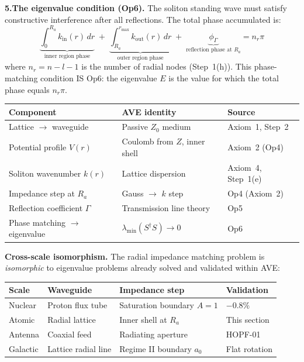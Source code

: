 \noindent\textbf{5.\;The eigenvalue condition (Op6).}
The soliton standing wave must satisfy constructive
interference after all reflections.
The total phase accumulated is:
\begin{equation}
    \underbrace{\int_0^{R_a} k_{\text{in}}(r)\,dr}_
    {\text{inner region phase}}
    \;+\;
    \underbrace{\int_{R_a}^{r_{\max}} k_{\text{out}}(r)\,dr}_
    {\text{outer region phase}}
    \;+\;
    \underbrace{\phi_\Gamma}_
    {\text{reflection phase at } R_a}
    = n_r \pi
    \label{eq:radial_eigenvalue}
\end{equation}
where $n_r = n - l - 1$ is the number of radial
nodes (Step~1(h)).  This phase-matching condition IS
Op6: the eigenvalue $E$ is the value for which the
total phase equals $n_r \pi$.

\begin{center}
\small
\renewcommand{\arraystretch}{1.25}
\begin{tabular}{lll}
\hline
\textbf{Component} & \textbf{AVE identity}
& \textbf{Source} \\
\hline
Lattice $\to$ waveguide & Passive $Z_0$ medium
& Axiom~1, Step~2 \\
Potential profile $V(r)$ & Coulomb from $Z$,
inner shell & Axiom~2 (Op4) \\
Soliton wavenumber $k(r)$ & Lattice dispersion
& Axiom~4, Step~1(e) \\
Impedance step at $R_a$ & Gauss $\to$ $k$ step
& Op4 (Axiom~2) \\
Reflection coefficient $\Gamma$ & Transmission line
theory & Op5 \\
Phase matching $\to$ eigenvalue & $\lambda_{\min}
(S^\dagger S) \to 0$ & Op6 \\
\hline
\end{tabular}
\end{center}

\noindent\textbf{Cross-scale isomorphism.}
The radial impedance matching problem is
\emph{isomorphic} to eigenvalue problems already
solved and validated within AVE:
\begin{center}
\small
\renewcommand{\arraystretch}{1.25}
\begin{tabular}{llll}
\hline
\textbf{Scale} & \textbf{Waveguide}
& \textbf{Impedance step}
& \textbf{Validation} \\
\hline
Nuclear & Proton flux tube
& Saturation boundary $A = 1$ & $-0.8\%$ \\
Atomic & Radial lattice
& Inner shell at $R_a$ & This section \\
Antenna & Coaxial feed
& Radiating aperture & HOPF-01 \\
Galactic & Lattice radial line
& Regime II boundary $a_0$ & Flat rotation \\
\hline
\end{tabular}
\end{center}

